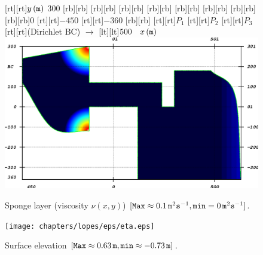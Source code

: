 \begin{figure}[htb!]
{\centering
{}[rt][rt]{$y\, ({\tt m})$\,\,$300$}
[rb][rb]{}
[rb][rb]{}
[rb][rb]{}
[rb][rb]{}
[rb][rb]{}
[rb][rb]{}
[rb][rb]{}
[rb][rb]{0}
[rt][rt]{$-450$}
[rt][rt]{$-360$}
[rb][rb]{}
[rt][rt]{\color{white}$P_1$}
[rt][rt]{\color{white}$P_2$}
[rt][rt]{\color{white}$P_3$}
[rt][rt]{(Dirichlet BC) \(\longrightarrow\)}
[lt][lt]{$500\quad x\, ({\tt m})$}
\includegraphics[width=\largewidth]{chapters/lopes/eps/sponge.eps}
\caption{Sponge layer (viscosity \(\nu(x,y)\)) \([{\tt Max} \approx 0.1\,{\tt m}^2{\tt
s}^{-1}, {\tt min}=0 \,{\tt m}^2{\tt s}^{-1}]\).}\label{lopes:fig:sponge}\par}
\end{figure}
\begin{figure}[!htb]
{\centering
\texttt{[image: chapters/lopes/eps/eta.eps]}
\caption{Surface elevation \([{\tt Max}\approx 0.63\,{\tt
m}, {\tt min}\approx-0.73\,{\tt m}] \).}\label{lopes:fig:elevation}\par}
\end{figure}
